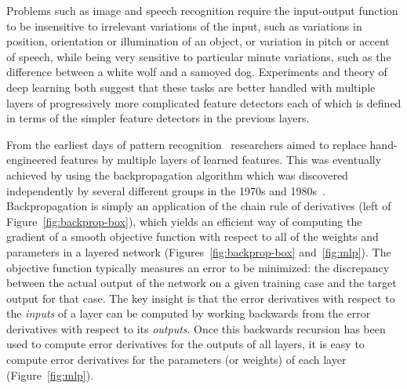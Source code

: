 \documentclass[10pts]{article}
\begin{document}
Problems such as image and speech recognition require the input-output
function to be insensitive to irrelevant variations of the input, such as
variations in position, orientation or illumination of an object, or
variation in pitch or accent of speech, while being very sensitive to
particular minute variations, such as the difference between a white wolf
and a samoyed dog. Experiments and theory of deep learning both
suggest that these tasks are better handled with multiple layers of
progressively more complicated feature detectors each of which is defined
in terms of the simpler feature detectors in the previous layers.

From the earliest days of pattern recognition~\citep{selfridge,Rosenblatt57}
researchers aimed to replace hand-engineered features by multiple layers of
learned features.  This was eventually achieved by using the
backpropagation algorithm which was discovered independently by several
different groups in the 1970s and 1980s~\citep{Werbos74,Parker85,LeCun85,RHW}.  
Backpropagation is simply an application of
the chain rule of derivatives (left of Figure~\ref{fig:backprop-box}),
which yields an efficient way of computing the gradient of a
smooth objective function with respect to all of the weights and parameters in 
a layered network (Figures~\ref{fig:backprop-box} and~\ref{fig:mlp}). 
The objective function typically measures an error to be minimized: 
the discrepancy between
the actual output of the network on a given training case and the target
output for that case.  The key insight is that the error derivatives with
respect to the {\it inputs} of a layer can be computed by working
backwards from the error derivatives with respect to its {\em outputs}. 
Once this backwards recursion has been used to compute
error derivatives for the outputs of all layers, it is easy to compute
error derivatives for the parameters (or weights) of each layer 
(Figure~\ref{fig:mlp}).
\end{document}
